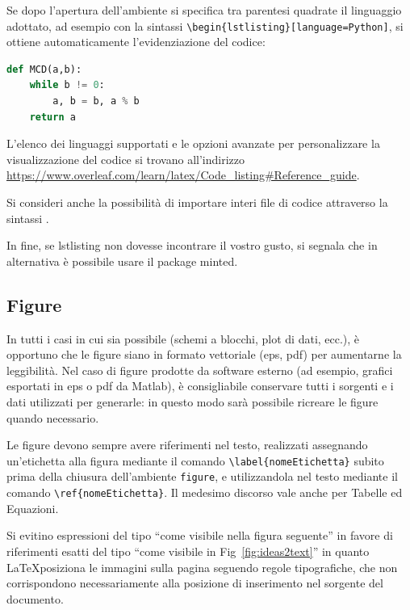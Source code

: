 \documentclass[12pt]{report}
\begin{document}
    Se dopo l'apertura dell'ambiente si specifica tra parentesi quadrate il linguaggio adottato, ad esempio con la sintassi \verb|\begin{lstlisting}[language=Python]|, si ottiene automaticamente l'evidenziazione del codice:

    \begin{lstlisting}[language=Python]
def MCD(a,b):
	while b != 0:
		a, b = b, a % b
	return a
    \end{lstlisting}

    L'elenco dei linguaggi supportati e le opzioni avanzate per personalizzare la visualizzazione del codice si trovano all'indirizzo \url{https://www.overleaf.com/learn/latex/Code_listing#Reference_guide}.

    Si consideri anche la possibilità di importare interi file di codice attraverso la sintassi \verb||.

    In fine, se lstlisting non dovesse incontrare il vostro gusto, si segnala che in alternativa è possibile usare il package minted.

    \subsection{Figure}

    In tutti i casi in cui sia possibile (schemi a blocchi, plot di dati, ecc.), \`e opportuno che le figure siano in formato vettoriale (eps, pdf) per aumentarne la leggibilit\`a.
    Nel caso di figure prodotte da software esterno (ad esempio, grafici esportati in eps o pdf da Matlab), \`e consigliabile conservare tutti i sorgenti e i dati utilizzati per generarle: in questo modo sarà possibile ricreare le figure quando necessario.

    Le figure devono sempre avere riferimenti nel testo, realizzati assegnando un'etichetta alla figura mediante il comando \verb|\label{nomeEtichetta}| subito prima della chiusura dell'ambiente \verb|figure|, e utilizzandola nel testo mediante il comando \verb|\ref{nomeEtichetta}|. Il medesimo discorso vale anche per Tabelle ed Equazioni.

    Si evitino espressioni del tipo ``come visibile nella figura seguente'' in favore di riferimenti esatti del tipo ``come visibile in Fig~\ref{fig:ideas2text}'' in quanto \LaTeX posiziona le immagini sulla pagina seguendo regole tipografiche, che non corrispondono necessariamente alla posizione di inserimento nel sorgente del documento.
\end{document}
